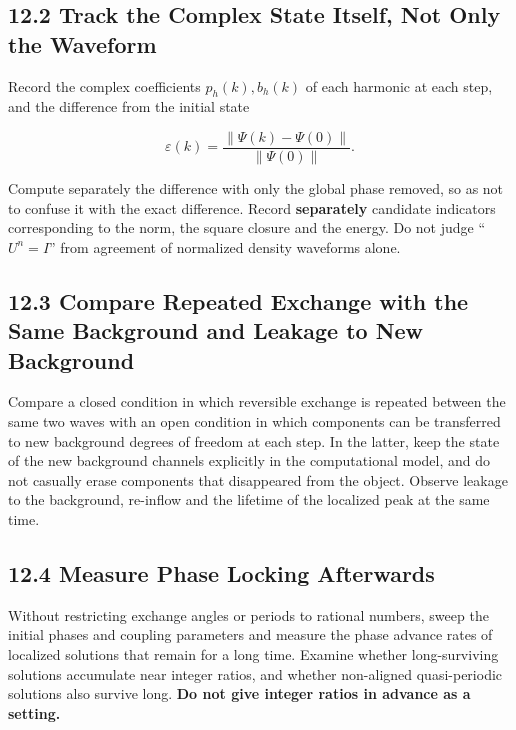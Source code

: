 \documentclass[
  a4paper,
]{article}
\begin{document}
\subsection{12.2 Track the Complex State Itself, Not Only the
Waveform}\label{track-the-complex-state-itself-not-only-the-waveform}

Record the complex coefficients \(p_h(k),b_h(k)\) of each harmonic at
each step, and the difference from the initial state

\[
\varepsilon(k)=
\frac{\|\Psi(k)-\Psi(0)\|}{\|\Psi(0)\|}.
\]

Compute separately the difference with only the global phase removed, so
as not to confuse it with the exact difference. Record
\textbf{separately} candidate indicators corresponding to the norm, the
square closure and the energy. Do not judge ``\(U^n=I\)'' from agreement
of normalized density waveforms alone.

\subsection{12.3 Compare Repeated Exchange with the Same Background and
Leakage to New
Background}\label{compare-repeated-exchange-with-the-same-background-and-leakage-to-new-background}

Compare a closed condition in which reversible exchange is repeated
between the same two waves with an open condition in which components
can be transferred to new background degrees of freedom at each step. In
the latter, keep the state of the new background channels explicitly in
the computational model, and do not casually erase components that
disappeared from the object. Observe leakage to the background,
re-inflow and the lifetime of the localized peak at the same time.

\subsection{12.4 Measure Phase Locking
Afterwards}\label{measure-phase-locking-afterwards}

Without restricting exchange angles or periods to rational numbers,
sweep the initial phases and coupling parameters and measure the phase
advance rates of localized solutions that remain for a long time.
Examine whether long-surviving solutions accumulate near integer ratios,
and whether non-aligned quasi-periodic solutions also survive long.
\textbf{Do not give integer ratios in advance as a setting.}
\end{document}
